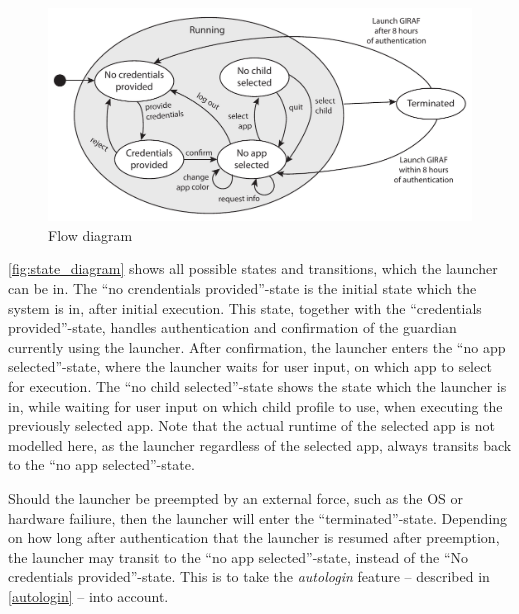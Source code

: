 \begin{figure}[h]
	\centering
	\includegraphics[width=1\textwidth]{gfx/statediagram.pdf}
	\caption{Flow diagram}
	\label{fig:flow_diagram}
\end{figure}

\autoref{fig:state_diagram} shows all possible states and transitions, which the launcher can be in.
The ``no crendentials provided''-state is the initial state which the system is in, after initial execution.
This state, together with the ``credentials provided''-state, handles authentication and confirmation of the guardian currently using the launcher.
After confirmation, the launcher enters the ``no app selected''-state, where the launcher waits for user input, on which app to select for execution.
The ``no child selected''-state shows the state which the launcher is in, while waiting for user input on which child profile to use, when executing the previously selected app.
Note that the actual runtime of the selected app is not modelled here, as the launcher regardless of the selected app, always transits back to the ``no app selected''-state.

Should the launcher be preempted by an external force, such as the OS or hardware failiure, then the launcher will enter the ``terminated''-state.
Depending on how long after authentication that the launcher is resumed after preemption, the launcher may transit to the ``no app selected''-state, instead of the ``No credentials provided''-state.
This is to take the \emph{autologin} feature -- described in \autoref{autologin} -- into account.
